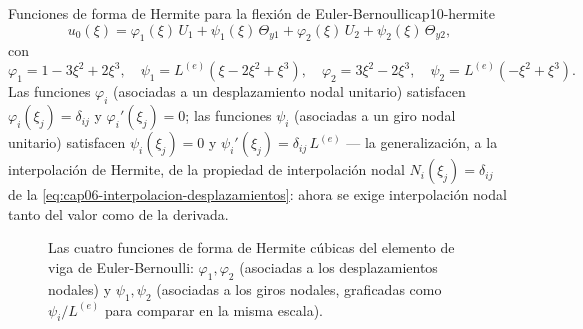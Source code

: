 \begin{ecnimportante}{Funciones de forma de Hermite para la flexión de Euler-Bernoulli}{cap10-hermite}
\[
u_0(\xi) = \varphi_1(\xi)\,U_1 + \psi_1(\xi)\,\Theta_{y1} + \varphi_2(\xi)\,U_2 + \psi_2(\xi)\,\Theta_{y2} ,
\]
con
\[
\varphi_1=1-3\xi^2+2\xi^3, \quad \psi_1=L^{(e)}\left(\xi-2\xi^2+\xi^3\right), \quad
\varphi_2=3\xi^2-2\xi^3, \quad \psi_2=L^{(e)}\left(-\xi^2+\xi^3\right) .
\]
Las funciones $\varphi_i$ (asociadas a un desplazamiento nodal unitario) satisfacen $\varphi_i(\xi_j)=\delta_{ij}$ y $\varphi_i'(\xi_j)=0$; las funciones $\psi_i$ (asociadas a un giro nodal unitario) satisfacen $\psi_i(\xi_j)=0$ y $\psi_i'(\xi_j)=\delta_{ij}\,L^{(e)}$ --- la generalización, a la interpolación de Hermite, de la propiedad de interpolación nodal $N_i(\xi_j)=\delta_{ij}$ de la \cref{eq:cap06-interpolacion-desplazamientos}: ahora se exige interpolación nodal tanto del valor como de la derivada.
\end{ecnimportante}

\begin{figure}[htbp]
\centering
{}
\caption{Las cuatro funciones de forma de Hermite cúbicas del elemento de viga de Euler-Bernoulli: $\varphi_1,\varphi_2$ (asociadas a los desplazamientos nodales) y $\psi_1,\psi_2$ (asociadas a los giros nodales, graficadas como $\psi_i/L^{(e)}$ para comparar en la misma escala).}
\label{fig:cap10-funciones-hermite}
\end{figure}

